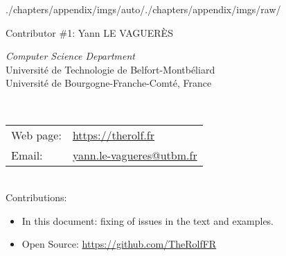 \begin{graphicspathcontext}{{./chapters/appendix/imgs/auto/}{./chapters/appendix/imgs/raw/}}
\begin{frame}{{Contributor \#1:} Yann LE VAGUER\`ES}
	\begin{minipage}[t]{.75\linewidth}
		\begin{raggedright}
			\textit{Computer Science Department} \\[.5cm]
			{\scriptsize
				Universit\'e de Technologie de Belfort-Montb\'eliard\\
				Universit\'e de Bourgogne-Franche-Comt\'e, France} \\[.25cm]
		\end{raggedright}
	\end{minipage}%
	\hfill%
	 \\[.5cm]%
	\begin{raggedright}
		\scriptsize \begin{tabularx}{\linewidth}{@{}lX@{}}
			Web page: & \url{https://therolf.fr} \\
			Email: & \href{mailto:yann.le-vagueres@utbm.fr}{yann.le-vagueres@utbm.fr} \\
		\end{tabularx} \\[.5cm]
		\scriptsize Contributions:\begin{itemize}\tiny
			\item In this document: fixing of issues in the text and examples.
			\item Open Source: \url{https://github.com/TheRolfFR}
		\end{itemize}
	\end{raggedright}
\end{frame}

%

\end{graphicspathcontext}
